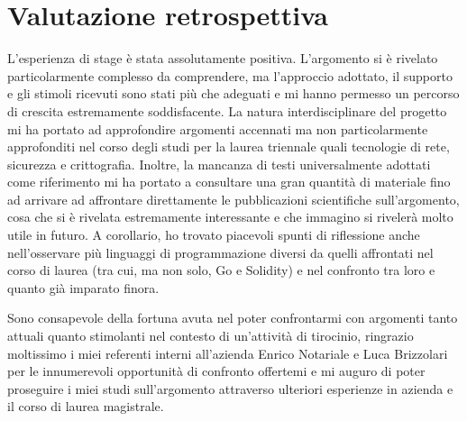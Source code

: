 \section{Valutazione retrospettiva}
	L'esperienza di stage è stata assolutamente positiva. L'argomento si è rivelato particolarmente complesso da comprendere, ma l'approccio adottato, il supporto e gli stimoli ricevuti sono stati più che adeguati e mi hanno permesso un percorso di crescita estremamente soddisfacente. La natura interdisciplinare del progetto mi ha portato ad approfondire argomenti accennati ma non particolarmente approfonditi nel corso degli studi per la laurea triennale quali tecnologie di rete, sicurezza e crittografia. Inoltre, la mancanza di testi universalmente adottati come riferimento mi ha portato a consultare una gran quantità di materiale fino ad arrivare ad affrontare direttamente le pubblicazioni scientifiche sull'argomento, cosa che si è rivelata estremamente interessante e che immagino si rivelerà molto utile in futuro. A corollario, ho trovato piacevoli spunti di riflessione anche nell'osservare più linguaggi di programmazione diversi da quelli affrontati nel corso di laurea (tra cui, ma non solo, Go e Solidity) e nel confronto tra loro e quanto già imparato finora.
	
	Sono consapevole della fortuna avuta nel poter confrontarmi con argomenti tanto attuali quanto stimolanti nel contesto di un'attività di tirocinio, ringrazio moltissimo i miei referenti interni all'azienda Enrico Notariale e Luca Brizzolari per le innumerevoli opportunità di confronto offertemi e mi auguro di poter proseguire i miei studi sull'argomento attraverso ulteriori esperienze in azienda e il corso di laurea magistrale.
	
